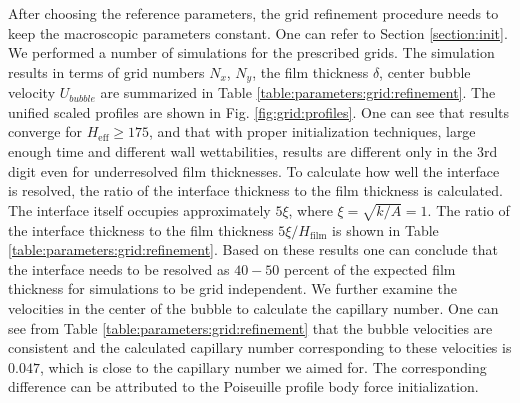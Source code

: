 \documentclass[preprint,12pt]{elsarticle}
\begin{document}
{\color{red} After choosing the reference parameters, the grid refinement procedure
needs to keep the macroscopic parameters constant. One can refer to Section \ref{section:init}.}  
We performed a number of simulations for the prescribed grids. The
simulation results in terms of grid numbers $N_x$, $N_y$, the film thickness $\delta$, center bubble
velocity $U_{bubble}$ are summarized in Table \ref{table:parameters:grid:refinement}.
The unified scaled profiles are shown in Fig. \ref{fig:grid:profiles}. One can
see that results converge for $H_{\mathrm{eff}}\geq 175$, and that with proper
initialization techniques, large enough time and different wall
wettabilities, results are different only in the 3rd digit even for
underresolved film thicknesses. To calculate how well the interface is
resolved, the ratio of the interface thickness to the film thickness is calculated. The
interface itself occupies approximately $5 \xi$, where
$\xi=\sqrt{k/A}=1$. The ratio of the interface thickness to the film thickness
$5\xi/H_{\mathrm{film}}$
 is shown in Table \ref{table:parameters:grid:refinement}. Based on these results one can conclude that
 the interface needs to be resolved as $40-50$ percent of the
expected film thickness for simulations to be grid independent. We further examine the
velocities in the center of the bubble to calculate the capillary number. One can see from Table
\ref{table:parameters:grid:refinement} that the bubble velocities are consistent and the
calculated capillary number corresponding to these velocities is $0.047$, which is {\color{red}
close to} the capillary number we aimed for. The corresponding difference can be
attributed to the Poiseuille profile body force initialization.%
\end{document}
